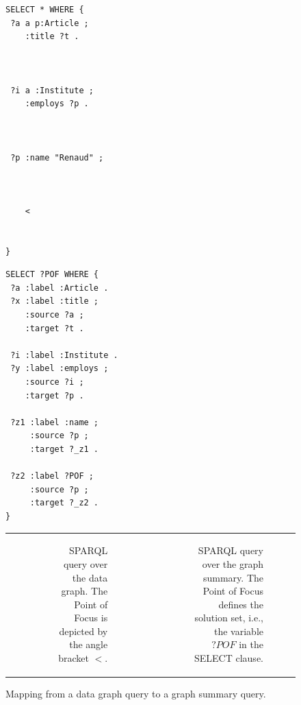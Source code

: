 \begin{figure}

\newsavebox{\sparql}
\begin{lrbox}{\sparql}
\begin{minipage}{0.3\textwidth}
\centering
\expandafter\def\csname PY@tok@err\endcsname{}
\begin{verbatim}
SELECT * WHERE {
 ?a a p:Article ;
    :title ?t .



 ?i a :Institute ;
    :employs ?p .



 ?p :name "Renaud" ;



    <


}
\end{verbatim}
\label{lst:sparql}
\end{minipage}
\end{lrbox}


\newsavebox{\sparqlSum}
\begin{lrbox}{\sparqlSum}
\begin{minipage}{0.4\textwidth}
\centering
\begin{verbatim}
SELECT ?POF WHERE {
 ?a :label :Article .
 ?x :label :title ;
    :source ?a ;
    :target ?t .

 ?i :label :Institute .
 ?y :label :employs ;
    :source ?i ;
    :target ?p .

 ?z1 :label :name ;
     :source ?p ;
     :target ?_z1 .

 ?z2 :label ?POF ;
     :source ?p ;
     :target ?_z2 .
}
\end{verbatim}
\label{lst:gs-sparql}
\end{minipage}
\end{lrbox}

\begin{tabular}{crccr}
	\phantom{a}
	&
	\begin{subfigure}[t]{.275\textwidth}
		\centering
		\usebox{\sparql}
		\caption{SPARQL query over the data graph. The Point of Focus is depicted by the angle bracket $<$.}
		\label{fig:entity-sparql}
	\end{subfigure}
	& \phantom{a} & \phantom{a} &
	\begin{subfigure}[t]{.55\textwidth}
		\centering
		\usebox{\sparqlSum}
		\caption{SPARQL query over the graph summary. The Point of Focus defines the solution set, i.e., the variable $?POF$ in the SELECT clause.}
		\label{fig:gs-sparql}
	\end{subfigure}
	\\
\end{tabular}
\caption{Mapping from a data graph query to a graph summary query.}
\label{fig:entity-gs-sparql}
\end{figure}


